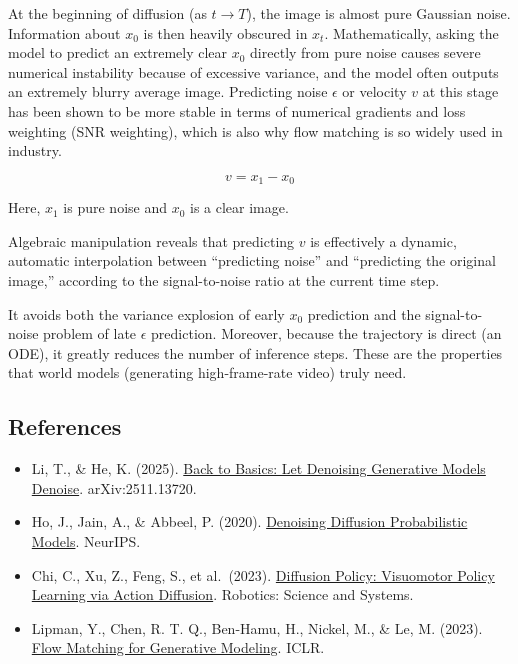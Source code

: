 At the beginning of diffusion (as \(t\to T\)), the image is almost pure Gaussian noise. Information about \(x_0\) is then heavily obscured in \(x_t\). Mathematically, asking the model to predict an extremely clear \(x_0\) directly from pure noise causes severe numerical instability because of excessive variance, and the model often outputs an extremely blurry average image. Predicting noise \(\epsilon\) or velocity \(v\) at this stage has been shown to be more stable in terms of numerical gradients and loss weighting (SNR weighting), which is also why flow matching is so widely used in industry.

\[
v=x_1-x_0
\]

Here, \(x_1\) is pure noise and \(x_0\) is a clear image.

Algebraic manipulation reveals that predicting \(v\) is effectively a dynamic, automatic interpolation between ``predicting noise'' and ``predicting the original image,'' according to the signal-to-noise ratio at the current time step.

It avoids both the variance explosion of early \(x_0\) prediction and the signal-to-noise problem of late \(\epsilon\) prediction. Moreover, because the trajectory is direct (an ODE), it greatly reduces the number of inference steps. These are the properties that world models (generating high-frame-rate video) truly need.

\FloatBarrier
{}
\hypertarget{references-133}{%
\subsection{References}\label{references-133}}

\vspace{0.25em}
\begin{itemize}
\tightlist
\item
  Li, T., \& He, K. (2025). \href{https://arxiv.org/abs/2511.13720}{Back to Basics: Let Denoising Generative Models Denoise}. arXiv:2511.13720.
\item
  Ho, J., Jain, A., \& Abbeel, P. (2020). \href{https://arxiv.org/abs/2006.11239}{Denoising Diffusion Probabilistic Models}. NeurIPS.
\item
  Chi, C., Xu, Z., Feng, S., et al.~(2023). \href{https://arxiv.org/abs/2303.04137}{Diffusion Policy: Visuomotor Policy Learning via Action Diffusion}. Robotics: Science and Systems.
\item
  Lipman, Y., Chen, R. T. Q., Ben-Hamu, H., Nickel, M., \& Le, M. (2023). \href{https://arxiv.org/abs/2210.02747}{Flow Matching for Generative Modeling}. ICLR.
\end{itemize}

\clearpage
